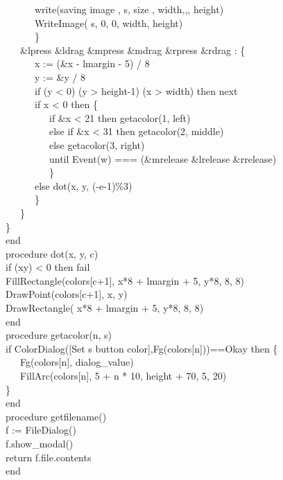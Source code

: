 {\>   \ \ \ \ \ \ write({\textquotedbl}saving image {\textquotedbl}, s,
{\textquotedbl} size {\textquotedbl},
width,{\textquotedbl},{\textquotedbl}, height) \\
\>   \ \ \ \ \ \ WriteImage( s, 0, 0, width, height) \\
\>   \ \ \ \ \ \ \} \\
\>   \ \ \ \&lpress {\textbar} \&ldrag {\textbar} \&mpress {\textbar}
\&mdrag {\textbar} \&rpress {\textbar} \&rdrag : \{ \\
\>   \ \ \ \ \ \ x := (\&x - lmargin - 5) / 8 \\
\>   \ \ \ \ \ \ y := \&y / 8 \\
\>   \ \ \ \ \ \ if (y {\textless} 0) {\textbar} (y {\textgreater}
height-1) {\textbar} (x {\textgreater} width) then next \\
\>   \ \ \ \ \ \ if x {\textless} 0 then \{ \\
\>   \ \ \ \ \ \ \ \ \ if \&x {\textless} 21 then getacolor(1,
{\textquotedbl}left{\textquotedbl}) \\
\>   \ \ \ \ \ \ \ \ \ else if \&x {\textless} 31 then getacolor(2,
{\textquotedbl}middle{\textquotedbl}) \\
\>   \ \ \ \ \ \ \ \ \ else getacolor(3,
{\textquotedbl}right{\textquotedbl}) \\
\>   \ \ \ \ \ \ \ \ \ until Event(w) === (\&mrelease {\textbar}
\&lrelease{\textbar} \&rrelease) \\
\>   \ \ \ \ \ \ \ \ \ \} \\
\>   \ \ \ \ \ \ else dot(x, y, (-e-1)\%3) \\
\>   \ \ \ \ \ \ \} \\
\>   \ \ \ \} \\
\>   \} \\
end
\ \\
procedure dot(x, y, c) \\
\>   if (x{\textbar}y) {\textless} 0 then fail \\
\>   FillRectangle(colors[c+1], x*8 + lmargin + 5, y*8, 8, 8) \\
\>   DrawPoint(colors[c+1], x, y) \\
\>   DrawRectangle( x*8 + lmargin + 5, y*8, 8, 8) \\
end
\ \\
procedure getacolor(n, s) \\
\>   if ColorDialog([{\textquotedbl}Set
{\textquotedbl}{\textbar}{\textbar}s{\textbar}{\textbar}{\textquotedbl}
button color{\textquotedbl}],Fg(colors[n]))=={\textquotedbl}Okay{\textquotedbl} then \{ \\
\>   \ \ \ Fg(colors[n], dialog\_value) \\
\>   \ \ \ FillArc(colors[n], 5 + n * 10, height + 70, 5, 20) \\
\>   \} \\
end
\ \\
procedure getfilename() \\
\>   f := FileDialog() \\
\>   f.show\_modal() \\
\>   return f.file.contents \\
end
}

